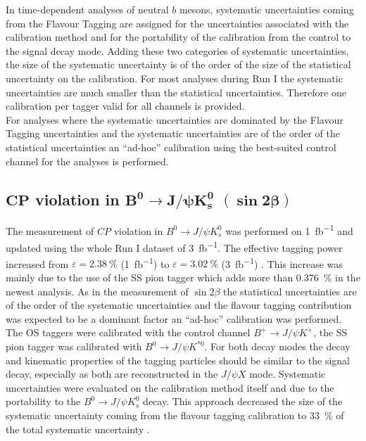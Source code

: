 \documentclass{PoS}
\begin{document}
In time-dependent analyses of neutral $b$ mesons, systematic uncertainties coming from the Flavour Tagging are assigned for the uncertainties associated with the calibration method and for the portability of the calibration from the control to the signal decay mode. Adding these two categories of systematic uncertainties, the size of the systematic uncertainty is of the order of the size of the statistical uncertainty on the calibration.
For most analyses  during Run I the systematic uncertainties are much smaller than the statistical uncertainties. Therefore one calibration per tagger valid for all channels is provided.\\
For analyses where the systematic uncertainties are dominated by the Flavour Tagging uncertainties and the systematic uncertainties are of the order of the statistical uncertainties an \enquote{ad-hoc} calibration using the best-suited control channel for the analyses is performed.

\subsection{$\bm{C\!P}$ violation in $\bm{B^0}\bm{\to} \bm{J\!/\!\psi K_s^0}$ $\pmb{(\sin 2\beta)}$}

The measurement of $C\!P$ violation in $B^0\to J\!/\!\psi K_s^0$ was performed on \SI{1}{fb^{-1}} and updated using the whole Run I dataset of \SI{3}{fb^{-1}}. The effective tagging power increased from $\varepsilon=\SI{2.38}{\%}$ (\SI{1}{fb^{-1}}) \cite{9} to $\varepsilon=\SI{3.02}{\%}$ (\SI{3}{fb^{-1}}) \cite{10}. This increase was mainly due to the use of the SS pion tagger which adds more than \SI{0.376}{\%} in the newest analysis. As in the measurement of $\sin 2\beta$ the statistical uncertainties are of the order of the systematic uncertainties and the flavour tagging contribution was expected to be a dominant factor an \enquote{ad-hoc} calibration was performed. The OS taggers were calibrated with the control channel $B^+\to J\!/\!\psi K^+$, the SS pion tagger was calibrated with $B^0\to J\!/\!\psi K^{*0}$. For both decay modes the decay and kinematic properties of the tagging particles should be similar to the signal decay, especially as both are reconstructed in the $J\!/\!\psi X$ mode. Systematic uncertainties were evaluated on the calibration method itself and due to the portability to the \mbox{$B^0\to J\!/\!\psi K_s^0$} decay. This approach decreased the size of the systematic uncertainty coming from the flavour tagging calibration to \SI{33}{\%} of the total systematic uncertainty \cite{10}.
\end{document}
